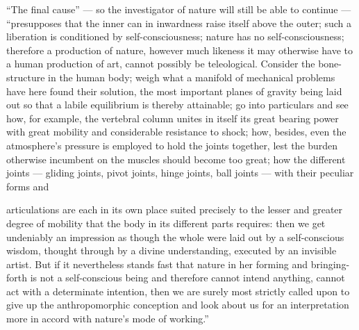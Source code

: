 \documentclass[12pt,a4paper]{book}
\begin{document}
``The final cause'' --- so the investigator of nature will still be able to
continue --- ``presupposes that the inner can in inwardness raise itself above
the outer; such a liberation is conditioned by self-consciousness; nature has no
self-consciousness; therefore a production of nature, however much likeness it
may otherwise have to a human production of art, cannot possibly be teleological.
Consider the bone-structure in the human body; weigh what a manifold of
mechanical problems have here found their solution, the most important planes of
gravity being laid out so that a labile equilibrium is thereby attainable; go
into particulars and see how, for example, the vertebral column unites in itself
its great bearing power with great mobility and considerable resistance to
shock; how, besides, even the atmosphere's pressure is employed to hold the
joints together, lest the burden otherwise incumbent on the muscles should become
too great; how the different joints --- gliding joints, pivot joints, hinge
joints, ball joints --- with their peculiar forms and

\setcounter{footnote}{0}
articulations are each in its own place suited precisely to the lesser and
greater degree of mobility that the body in its different parts requires: then
we get undeniably an impression as though the whole were laid out by a
self-conscious wisdom, thought through by a divine understanding, executed by an
invisible artist. But if it nevertheless stands fast that nature in her forming
and bringing-forth is not a self-conscious being and therefore cannot intend
anything, cannot act with a determinate intention, then we are surely most
strictly called upon to give up the anthropomorphic conception and look about us
for an interpretation more in accord with nature's mode of working.''
\end{document}
